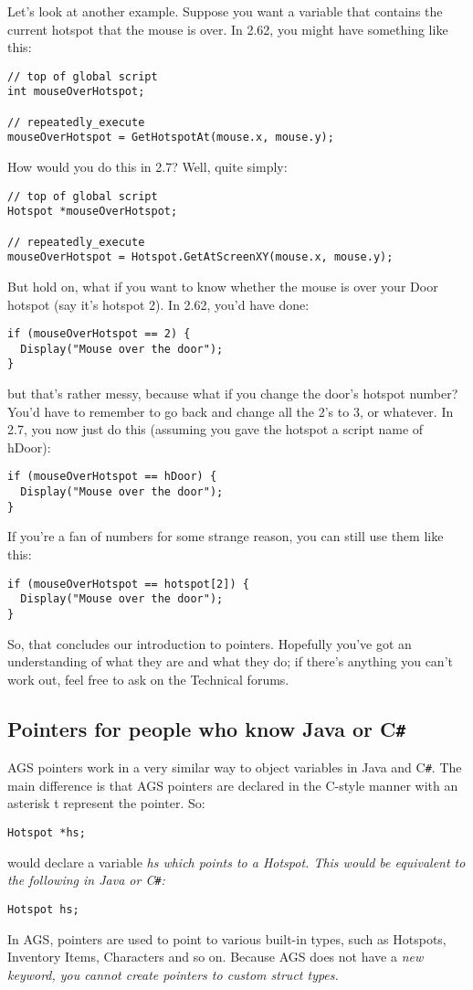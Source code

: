 Let's look at another example. Suppose you want a variable that contains the current
hotspot that the mouse is over. In 2.62, you might have something like this:
\begin{verbatim}
// top of global script
int mouseOverHotspot;

// repeatedly_execute
mouseOverHotspot = GetHotspotAt(mouse.x, mouse.y);
\end{verbatim}
How would you do this in 2.7? Well, quite simply:
\begin{verbatim}
// top of global script
Hotspot *mouseOverHotspot;

// repeatedly_execute
mouseOverHotspot = Hotspot.GetAtScreenXY(mouse.x, mouse.y);
\end{verbatim}
But hold on, what if you want to know whether the mouse is over your Door hotspot (say
it's hotspot 2). In 2.62, you'd have done:
\begin{verbatim}
if (mouseOverHotspot == 2) {
  Display("Mouse over the door");
}
\end{verbatim}
but that's rather messy, because what if you change the door's hotspot number? You'd
have to remember to go back and change all the 2's to 3, or whatever. In 2.7, you now just
do this (assuming you gave the hotspot a script name of hDoor):
\begin{verbatim}
if (mouseOverHotspot == hDoor) {
  Display("Mouse over the door");
}
\end{verbatim}
If you're a fan of numbers for some strange reason, you can still use them like this:
\begin{verbatim}
if (mouseOverHotspot == hotspot[2]) {
  Display("Mouse over the door");
}
\end{verbatim}
So, that concludes our introduction to pointers. Hopefully you've got an understanding of
what they are and what they do; if there's anything you can't work out, feel free to ask
on the Technical forums.


\subsection{Pointers for people who know Java or C\verb$#$}\label{PointersForJavaCSharp}%

AGS pointers work in a very similar way to object variables in Java and C\verb$#$. The main
difference is that AGS pointers are declared in the C-style manner with an asterisk t
represent the pointer. So:
\begin{verbatim}
Hotspot *hs;
\end{verbatim}
would declare a variable \it{hs} which points to a Hotspot. This would be equivalent to
the following in Java or C\verb$#$:
\begin{verbatim}
Hotspot hs;
\end{verbatim}
In AGS, pointers are used to point to various built-in types, such as Hotspots, Inventory Items,
Characters and so on. Because AGS does not have a \it{new} keyword, you cannot create pointers
to custom struct types.

